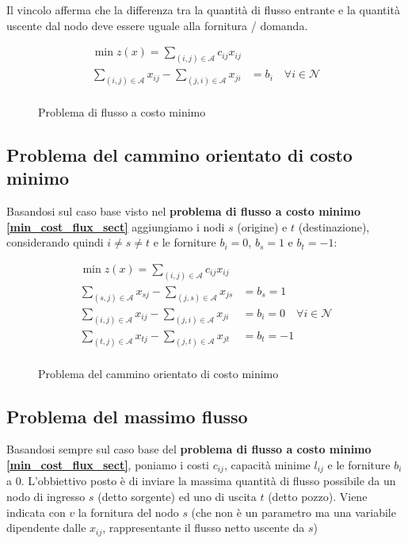 \documentclass[\main/main.tex]{subfiles}
\begin{document}
Il vincolo afferma che la differenza tra  la quantità di flusso entrante e la quantità uscente dal nodo deve essere uguale alla fornitura / domanda.

\begin{figure}
	\begin{align*}
		\min z(x) = \sum_{(i,j) \in \mathcal{A}} c_{ij}x_{ij}                                                             \\
		\sum_{(i,j) \in \mathcal{A}} x_{ij} - \sum_{(j,i) \in \mathcal{A}} x_{ji} & = b_i \quad \forall i \in \mathcal{N} \\
	\end{align*}
	\caption{Problema di flusso a costo minimo}
\end{figure}

\subsection{Problema del cammino orientato di costo minimo}
Basandosi sul caso base visto nel \textbf{problema di flusso a costo minimo \ref{min_cost_flux_sect}} aggiungiamo i nodi $s$ (origine) e $t$ (destinazione), considerando quindi $i\neq s \neq t$ e le forniture $b_i = 0$, $b_s = 1$ e $b_t = -1$:

\begin{figure}
	\begin{align*}
		\min z(x) = \sum_{(i,j) \in \mathcal{A}} c_{ij}x_{ij}                                                                 \\
		\sum_{(s,j) \in \mathcal{A}} x_{sj} - \sum_{(j,s) \in \mathcal{A}} x_{js} & = b_s = 1                                 \\
		\sum_{(i,j) \in \mathcal{A}} x_{ij} - \sum_{(j,i) \in \mathcal{A}} x_{ji} & = b_i = 0 \quad \forall i \in \mathcal{N} \\
		\sum_{(t,j) \in \mathcal{A}} x_{tj} - \sum_{(j,t) \in \mathcal{A}} x_{jt} & = b_t = -1                                \\
	\end{align*}
	\caption{Problema del cammino orientato di costo minimo}
\end{figure}

\subsection{Problema del massimo flusso}
Basandosi sempre sul caso base del \textbf{problema di flusso a costo minimo \ref{min_cost_flux_sect}}, poniamo i costi $c_{ij}$, capacità minime $l_{ij}$ e le forniture $b_i$ a $0$. L'obbiettivo posto è di inviare la massima quantità di flusso possibile da un nodo di ingresso $s$ (detto sorgente) ed uno di uscita $t$ (detto pozzo). Viene indicata con $v$ la fornitura del nodo $s$ (che non è un parametro ma una variabile dipendente dalle $x_{ij}$, rappresentante il flusso netto uscente da $s$)
\end{document}
